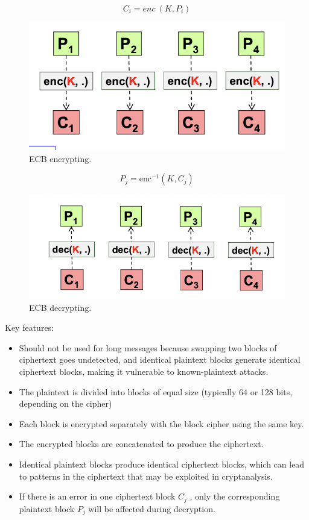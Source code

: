 \begin{multicols}{2}
    \begin{equation*}
        \boxed{C_i = enc \ (K, P_i)}
    \end{equation*}
    \begin{figure}[H]
        \includegraphics[width=\linewidth]{Images/Cryptography/ECBEncrypt.png}
        \caption{ECB encrypting.}
    \end{figure}
    \columnbreak
    \begin{equation*}
        \boxed{P_j = \text{enc}^{-1}(K, C_j)}
    \end{equation*}
    \begin{figure}[H]
        \includegraphics[width=\linewidth]{Images/Cryptography/ECBDecrypt.png}
        \caption{ECB decrypting.}
    \end{figure}
\end{multicols}

Key features:
\begin{itemize}
    \item Should not be used for long messages because swapping two blocks of ciphertext goes undetected, and identical plaintext blocks generate identical ciphertext blocks, making it vulnerable to known-plaintext attacks.
    \item The plaintext is divided into blocks of equal size (typically 64 or 128 bits, depending on the cipher)
    \item Each block is encrypted separately with the block cipher using the same key.
    \item The encrypted blocks are concatenated to produce the ciphertext.
    \item Identical plaintext blocks produce identical ciphertext blocks, which can lead to patterns in the ciphertext that may be exploited in cryptanalysis.
    \item If there is an error in one ciphertext block  $C_j$ , only the corresponding plaintext block  $P_j$  will be affected during decryption.
\end{itemize}

